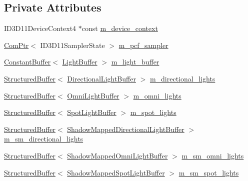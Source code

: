 \subsection*{Private Attributes}
\begin{DoxyCompactItemize}
\item 
I\+D3\+D11\+Device\+Context4 $\ast$const \hyperlink{classmage_1_1_l_buffer_pass_aa3f3eb2e2e4303398553eb9f07344845}{m\+\_\+device\+\_\+context}
\item 
\hyperlink{namespacemage_ae74f374780900893caa5555d1031fd79}{Com\+Ptr}$<$ I\+D3\+D11\+Sampler\+State $>$ \hyperlink{classmage_1_1_l_buffer_pass_aaf8dacd30171f31fe2a898fbdd91a990}{m\+\_\+pcf\+\_\+sampler}
\item 
\hyperlink{classmage_1_1_constant_buffer}{Constant\+Buffer}$<$ \hyperlink{structmage_1_1_light_buffer}{Light\+Buffer} $>$ \hyperlink{classmage_1_1_l_buffer_pass_a5946e3e691734567824644f8d1ec77b9}{m\+\_\+light\+\_\+buffer}
\item 
\hyperlink{classmage_1_1_structured_buffer}{Structured\+Buffer}$<$ \hyperlink{structmage_1_1_directional_light_buffer}{Directional\+Light\+Buffer} $>$ \hyperlink{classmage_1_1_l_buffer_pass_a90327556a34fe3a56e6980accead0c44}{m\+\_\+directional\+\_\+lights}
\item 
\hyperlink{classmage_1_1_structured_buffer}{Structured\+Buffer}$<$ \hyperlink{structmage_1_1_omni_light_buffer}{Omni\+Light\+Buffer} $>$ \hyperlink{classmage_1_1_l_buffer_pass_afc2754b9d3a3b1c2171cd1a6e5b2349d}{m\+\_\+omni\+\_\+lights}
\item 
\hyperlink{classmage_1_1_structured_buffer}{Structured\+Buffer}$<$ \hyperlink{structmage_1_1_spot_light_buffer}{Spot\+Light\+Buffer} $>$ \hyperlink{classmage_1_1_l_buffer_pass_af1612aa2a8d24303ebcf9e72125698f3}{m\+\_\+spot\+\_\+lights}
\item 
\hyperlink{classmage_1_1_structured_buffer}{Structured\+Buffer}$<$ \hyperlink{structmage_1_1_shadow_mapped_directional_light_buffer}{Shadow\+Mapped\+Directional\+Light\+Buffer} $>$ \hyperlink{classmage_1_1_l_buffer_pass_a37a31075c8906191cce6141db50e3b5c}{m\+\_\+sm\+\_\+directional\+\_\+lights}
\item 
\hyperlink{classmage_1_1_structured_buffer}{Structured\+Buffer}$<$ \hyperlink{structmage_1_1_shadow_mapped_omni_light_buffer}{Shadow\+Mapped\+Omni\+Light\+Buffer} $>$ \hyperlink{classmage_1_1_l_buffer_pass_a8eec79470d3ee5a5f8f71931de533131}{m\+\_\+sm\+\_\+omni\+\_\+lights}
\item 
\hyperlink{classmage_1_1_structured_buffer}{Structured\+Buffer}$<$ \hyperlink{structmage_1_1_shadow_mapped_spot_light_buffer}{Shadow\+Mapped\+Spot\+Light\+Buffer} $>$ \hyperlink{classmage_1_1_l_buffer_pass_a034b3ec298eb4c4c3688c0ebaed91883}{m\+\_\+sm\+\_\+spot\+\_\+lights}

\end{DoxyCompactItemize}
